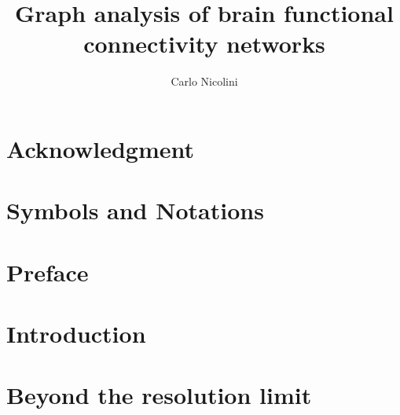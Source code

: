 
%

\title{Graph analysis of brain functional connectivity networks}
\author{Carlo Nicolini}

\newtheorem{obs}{Observation}
\newtheorem{props}{Proposition}



\maketitle
{}

\tableofcontents
\listoftodos

\chapter*{Acknowledgment}


\chapter*{Symbols and Notations}



\chapter*{Preface}\label{chap:preface}



\chapter{Introduction}\label{chap:introduction}
	

\chapter{Beyond the resolution limit}\label{chap:surprise}
	
% 	

% 	

